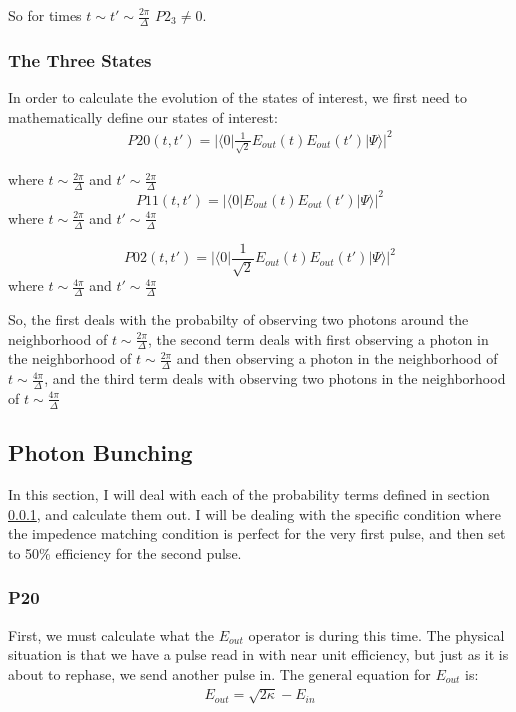 \documentclass[12pt]{article}
\begin{document}
So for times $t\sim t'\sim \frac{2 \pi}{\Delta}$ $P2_3 \neq 0$.




\subsubsection{The Three States}
\label{sec:three}
In order to calculate the evolution of the states of interest, we first need to mathematically define our states of interest:
\begin{align}
\label{eq:p20}
P20(t,t') = | \langle 0 | \frac{1}{\sqrt{2}} E_{out}(t) E_{out}(t') | \Psi \rangle |^2
\end{align}

where $t\sim\frac{2\pi}{\Delta}$ and $t' \sim\frac{2 \pi}{\Delta}$
\begin{equation}
\label{eq:p11}
P11(t,t') = | \langle 0 |  E_{out}(t) E_{out}(t') | \Psi \rangle |^2
\end{equation}
where $t\sim\frac{2\pi}{\Delta}$ and $t'\sim\frac{4 \pi}{\Delta}$

\begin{equation}
\label{eq:p02}
P02(t,t') = | \langle 0 | \frac{1}{\sqrt{2}} E_{out}(t) E_{out}(t') | \Psi \rangle |^2
\end{equation}
where $t\sim\frac{4\pi}{\Delta}$ and $t'\sim\frac{4\pi}{\Delta}$

So, the first deals with the probabilty of observing two photons around the neighborhood of $t\sim\frac{2 \pi}{\Delta}$, the second term deals with first observing a photon in the neighborhood of $t\sim\frac{2 \pi}{\Delta}$ and then observing a photon in the neighborhood of $t\sim\frac{4 \pi}{\Delta}$, and the third term deals with observing two photons in the neighborhood
of $t\sim\frac{4 \pi}{\Delta}$

\label{eqderv}
\subsection{Photon Bunching}
\label{phbnch}

In this section, I will deal with each of the probability terms defined in section \ref{sec:three}, and calculate them out. I will be dealing with the specific condition where the impedence matching condition is perfect for the very first pulse, and then set to 50\% efficiency for the second pulse.

\subsubsection{P20}
First, we must calculate what the $E_{out}$ operator is during this time. The physical situation is that we have a
pulse read in with near unit efficiency, but just as it is about to rephase, we send another pulse in. The general equation for $E_{out}$ is:
\begin{align}
E_{out} = \sqrt{2\kappa} - E_{in}
\end{align}
\end{document}
